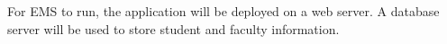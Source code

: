   For EMS to run, the application will be deployed on a web server. A database server will be used to store student and faculty information.
